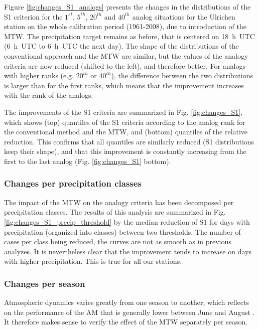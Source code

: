 \documentclass[hess, manuscript]{copernicus}
\begin{document}
Figure \ref{fig:changes_S1_analogs} presents the changes in the distributions of the S1 criterion for the $1^{st}$, $5^{th}$, $20^{th}$ and $40^{th}$ analog situations for the Ulrichen station on the whole calibration period (1961-2008), due to introduction of the MTW. The precipitation target remains as before, that is centered on 18~h~UTC (6~h~UTC to 6~h~UTC the next day). The shape of the distributions of the conventional approach and the MTW are similar, but the values of the analogy criteria are now reduced (shifted to the left), and therefore better. For analogs with higher ranks (e.g. $20^{th}$ or $40^{th}$), the difference between the two distributions is larger than for the first ranks, which means that the improvement increases with the rank of the analogs. 

The improvements of the S1 criteria are summarized in Fig. \ref{fig:changes_S1}, which shows (top) quantiles of the S1 criteria according to the analog rank for the conventional method and the MTW, and (bottom) quantiles of the relative reduction. This confirms that all quantiles are similarly reduced (S1 distributions keep their shape), and that this improvement is constantly increasing from the first to the last analog (Fig. \ref{fig:changes_S1} bottom).


\subsubsection{Changes per precipitation classes}
\label{sec:influence_precip}

The impact of the MTW on the analogy criteria has been decomposed per precipitation classes. The results of this analysis are summarized in Fig. \ref{fig:changes_S1_precip_threshold} by the median reduction of S1 for days with precipitation (organized into classes) between two thresholds. The number of cases per class being reduced, the curves are not as smooth as in previous analyzes. It is nevertheless clear that the improvement tends to increase on days with higher precipitation. This is true for all our stations.


\subsubsection{Changes per season}
\label{sec:seasonal_effect}

Atmospheric dynamics varies greatly from one season to another, which reflects on the performance of the AM that is generally lower between June and August \citep{Bliefernicht2010}. It therefore makes sense to verify the effect of the MTW separately per season.
\end{document}
